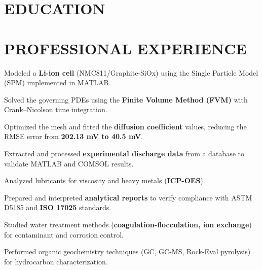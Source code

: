 \documentclass[10pt]{article}
\begin{document}

\section{EDUCATION}

\section{PROFESSIONAL EXPERIENCE}
\begin{bul}
\item Modeled a \textbf{Li-ion cell} (NMC811/Graphite-SiOx) using the Single Particle Model (SPM) implemented in MATLAB.
\item Solved the governing PDEs using the \textbf{Finite Volume Method (FVM)} with Crank–Nicolson time integration.
\item Optimized the mesh and fitted the \textbf{diffusion coefficient} values, reducing the RMSE error from \textbf{202.13 mV to 40.5 mV}.
\item Extracted and processed \textbf{experimental discharge data} from a database to validate MATLAB and COMSOL results.
\end{bul}
\begin{bul}
\item Analyzed lubricants for viscosity and heavy metals (\textbf{ICP-OES}).
\item Prepared and interpreted \textbf{analytical reports} to verify compliance with ASTM D5185 and \textbf{ISO 17025} standards.
\end{bul}
\begin{bul}
\item Studied water treatment methods (\textbf{coagulation-flocculation, ion exchange}) for contaminant and corrosion control.
\item Performed organic geochemistry techniques (GC, GC-MS, Rock-Eval pyrolysis) for hydrocarbon characterization.
\end{bul}
\end{document}
